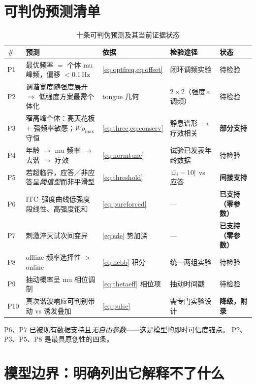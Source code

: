 \section{可判伪预测清单}
\label{sec:predictions}

\begin{table}[htbp]
\centering
\caption{十条可判伪预测及其当前证据状态}
\label{tab:predictions}
\footnotesize
\begin{tabularx}{\textwidth}{@{}l X l X l@{}}
\toprule
\# & 预测 & 依据 & 检验途径 & 状态 \\
\midrule
P1 & 最优频率 $=$ 个体 mu 峰频，偏移 $<0.1\,$Hz
   & \cref{eq:optfreq,eq:offset} & 闭环调频实验 & 待检验 \\
P2 & 调谐宽度随强度展开 $\Rightarrow$ 低强度方案最需个体化
   & tongue 几何 & $2\times2$（强度$\times$调频） & 待检验 \\
P3 & 窄高峰个体：高天花板 $+$ 强频率敏感；$W\rho_{\max}$ 守恒
   & \cref{eq:three,eq:conserv} & 静息谱形 $\to$ 疗效相关 & \textbf{部分支持} \\
P4 & 年龄 $\to$ mu 频率 $\to$ 去谐 $\to$ 疗效
   & \cref{eq:normtune} & 试验已发表年龄数据 & 待检验 \\
P5 & 若超临界，应答／非应答呈\emph{阈值型}而非平滑型
   & \cref{eq:threshold} & $|\bar{\omega}_i-10|$ vs 应答 & \textbf{间接支持} \\
P6 & ITC--强度曲线低强度段线性、高强度饱和
   & \cref{eq:pureforced} & --- & \textbf{已支持（零参数）} \\
P7 & 刺激淬灭试次间变异
   & \cref{eq:sde} 势加深 & --- & \textbf{已支持（零参数）} \\
P8 & offline 频率选择性 $>$ online
   & \cref{eq:hebb} 积分 & 统一两组实验 & 待检验 \\
P9 & 抽动概率呈 mu 相位调制
   & \cref{eq:thetaeff} 相位项 & 抽动时间戳 & 待检验 \\
P10 & 真次谐波响应可判别带动 vs 诱发叠加
   & \cref{eq:pulse} & 需专门实验设计 & \textbf{降级，附录} \\
\bottomrule
\end{tabularx}
\end{table}

P6、P7 已被现有数据支持且\emph{无自由参数}——这是模型的即时可信度锚点。
P2、P3、P5、P8 是最具原创性的四条。

\section{模型边界：明确列出它解释不了什么}
\label{sec:boundary}

